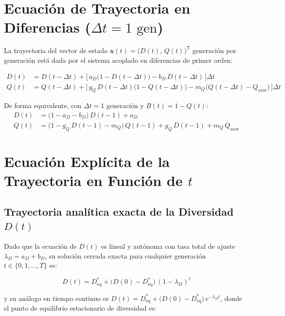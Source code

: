 \documentclass[11pt,letterpaper]{article}
\begin{document}
\section{Ecuación de Trayectoria en Diferencias ($\Delta t = 1\text{ gen}$)}

La trayectoria del vector de estado $\mathbf{x}(t) = \big(D(t),\, Q(t)\big)^{\mathsf{T}}$ generación por generación está dada por el sistema acoplado en diferencias de primer orden:

\begin{equation}
\boxed{
\begin{aligned}
D(t) &= D(t - \Delta t) + \Big[\,a_D\big(1 - D(t - \Delta t)\big) - b_D\,D(t - \Delta t)\,\Big]\Delta t \\[6pt]
Q(t) &= Q(t - \Delta t) + \Big[\,g_Q\,D(t - \Delta t)\big(1 - Q(t - \Delta t)\big) - m_Q\big(Q(t - \Delta t) - Q_{\text{azar}}\big)\,\Big]\Delta t
\end{aligned}
}
\end{equation}

De forma equivalente, con $\Delta t = 1$ generación y $B(t) = 1 - Q(t)$:
\begin{align}
D(t) &= \big(1 - a_D - b_D\big)\,D(t-1) + a_D \\
Q(t) &= \big(1 - g_Q\,D(t-1) - m_Q\big)\,Q(t-1) + g_Q\,D(t-1) + m_Q\,Q_{\text{azar}}
\end{align}

\section{Ecuación Explícita de la Trayectoria en Función de $t$}

\subsection{Trayectoria analítica exacta de la Diversidad $D(t)$}
Dado que la ecuación de $D(t)$ es lineal y autónoma con tasa total de ajuste $\lambda_D = a_D + b_D$, su solución cerrada exacta para cualquier generación $t \in \{0, 1, \dots, T\}$ es:

\begin{equation}
\boxed{
D(t) = D^*_{\text{eq}} + \big(D(0) - D^*_{\text{eq}}\big)\,(1 - \lambda_D)^t
}
\end{equation}

y su análogo en tiempo continuo es $D(t) = D^*_{\text{eq}} + \big(D(0) - D^*_{\text{eq}}\big)\,e^{-\lambda_D t}$, donde el punto de equilibrio estacionario de diversidad es:
\end{document}
